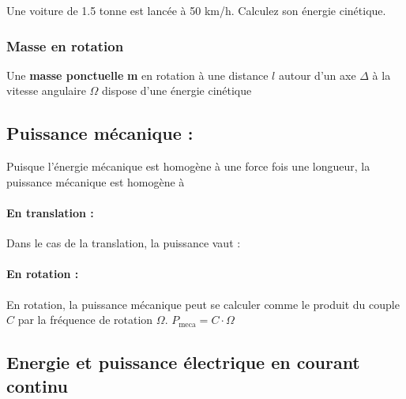 \documentclass[10pt,fleqn]{article} %
\begin{document}
\begin{exemple}
    Une voiture de 1.5 tonne est lancée à 50 km/h. Calculez son énergie cinétique. 

\afaire {}

\correction{}
\end{exemple}


\subsubsection{Masse en rotation}
\begin{defi}
  Une \textbf{masse ponctuelle} \textbf{m} en rotation à une distance $l$ autour d'un axe $\Delta$ à la vitesse angulaire $\Omega$ dispose d'une énergie cinétique 
\end{defi}


\subsection{Puissance mécanique : }
Puisque l'énergie mécanique est homogène à une force fois une longueur, la puissance mécanique est homogène à 

\begin{defi}
  \paragraph{En translation : } Dans le cas de la translation, la puissance vaut : 
\paragraph{En rotation : }En rotation, la puissance mécanique peut se calculer comme le produit du couple $C$ par la fréquence de rotation $\Omega$. 
$P_{\text{meca}} = C \cdot \Omega$
\end{defi}


\subsection{Energie et puissance électrique en courant continu}
\end{document}
